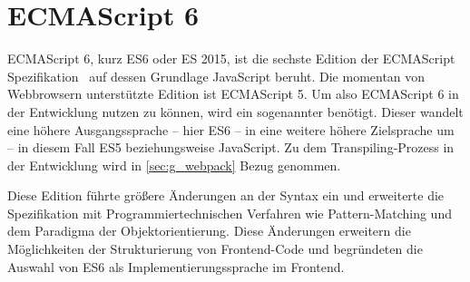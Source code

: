 \section{ECMAScript 6}
\label{sec:g_ecma_script_6}

ECMAScript 6, kurz ES6 oder ES 2015, ist die sechste Edition der ECMAScript
Spezifikation~\cite{es6} auf dessen Grundlage JavaScript beruht.  Die momentan
von Webbrowsern unterstützte Edition ist ECMAScript 5.  Um also ECMAScript 6 in
der Entwicklung nutzen zu können, wird ein sogenannter 
benötigt.  Dieser wandelt eine höhere Ausgangssprache -- hier ES6 -- in eine
weitere höhere Zielsprache um -- in diesem Fall ES5 beziehungsweise JavaScript.
Zu dem Transpiling-Prozess in der Entwicklung wird in \cref{sec:g_webpack} Bezug
genommen.

Diese Edition führte größere Änderungen an der Syntax ein und erweiterte die
Spezifikation mit Programmiertechnischen Verfahren wie Pattern-Matching und dem
Paradigma der Objektorientierung.  Diese Änderungen erweitern die Möglichkeiten
der Strukturierung von Frontend-Code und begründeten die Auswahl von ES6 als
Implementierungssprache im Frontend.




